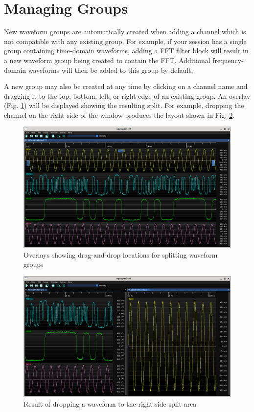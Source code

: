 \section{Managing Groups}

New waveform groups are automatically created when adding a channel which is not compatible with any existing group.
For example, if your session has a single group containing time-domain waveforms, adding a FFT filter block will result
in a new waveform group being created to contain the FFT. Additional frequency-domain waveforms will then be added to
this group by default.

A new group may also be created at any time by clicking on a channel name and dragging it to the top, bottom, left, or
right edge of an existing group. An overlay (Fig. \ref{split-overlays}) will be displayed showing the resulting split.
For example, dropping the channel on the right side of the window produces the layout shown in Fig. \ref{split-right}.

\begin{figure}[h]
\centering
\includegraphics[width=13cm]{ng-images/split-overlays.png}
\caption{Overlays showing drag-and-drop locations for splitting waveform groups}
\label{split-overlays}
\end{figure}

\begin{figure}[h]
\centering
\includegraphics[width=13cm]{ng-images/split-right.png}
\caption{Result of dropping a waveform to the right side split area}
\label{split-right}
\end{figure}

